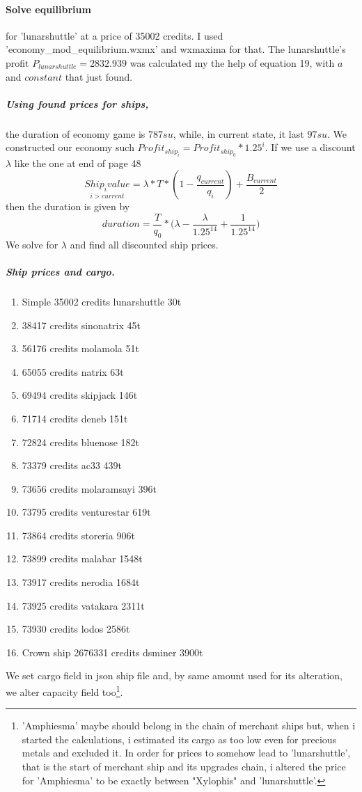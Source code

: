 \documentclass[]{article}
\begin{document}
\paragraph{Solve equilibrium} for 'lunarshuttle' at a price of 35002 credits. I used 'economy\_mod\_equilibrium.wxmx' and wxmaxima for that. The lunarshuttle's profit $P_{lunarshuttle}=2832.939$ was calculated my the help of equation 19, with $a$ and $constant$ that just found.
\subparagraph*{Using found prices for ships,} the duration of economy game is $787su$, while, in current state, it last $97su$. We constructed our economy such $Profit_{ship_{i}}=Profit_{ship_{0}}*1.25^{i}$. If we use a discount $\lambda$ like the one at end of page 48 
\[\underset{i > current}{Ship_{i}value}=\lambda*T*(1-\dfrac{q_{current}}{q_{i}})+\dfrac{B_{current}}{2}\]then the duration is given by \[duration=\dfrac{T}{q_{0}}*\big(\lambda-\dfrac{\lambda}{1.25^{14}}+\dfrac{1}{1.25^{14}}\big)\]   We solve for $\lambda$ and  find all discounted ship prices.
\subparagraph{Ship prices and cargo.}
\begin{enumerate}[label=\Roman*,start=0]
\item 	Simple 35002 credits lunarshuttle	30t
	\item 38417 credits	sinonatrix	45t
		\item 56176 credits	molamola	51t		
		\item 65055 credits	natrix	63t
	\item  69494 credits	skipjack	146t
	\item 71714 credits	deneb	151t			
	\item 72824 credits	bluenose	182t		
	\item  73379 credits	ac33	439t
\item 73656 credits	molaramsayi	396t	
	\item  73795 credits	venturestar	619t
	\item 73864 credits	storeria	906t	
	\item 73899 credits	malabar	1548t
	\item  73917 credits	nerodia	1684t
	\item  73925 credits	vatakara	2311t				
	\item 73930 credits	lodos	2586t			
	\item Crown ship 2676331 credits dsminer	3900t
\end{enumerate}

We set cargo field in json ship file and, by same amount used for its alteration, we alter capacity field too\footnote{\nopagebreak'Amphiesma' maybe should belong in the chain of merchant ships but, when i started the calculations, i estimated its cargo as too low even for precious metals and excluded it. In order for prices to somehow lead to 'lunarshuttle', that is the start of merchant ship and its upgrades chain, i altered the price for 'Amphiesma' to be exactly between "Xylophis" and 'lunarshuttle'.  }. 
\end{document}
